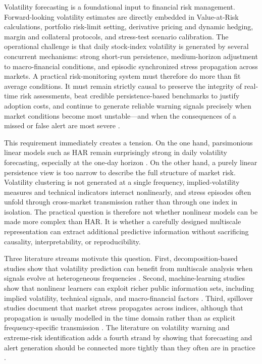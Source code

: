 Volatility forecasting is a foundational input to financial risk management. Forward-looking volatility estimates are directly embedded in Value-at-Risk calculations, portfolio risk-limit setting, derivative pricing and dynamic hedging, margin and collateral protocols, and stress-test scenario calibration. The operational challenge is that daily stock-index volatility is generated by several concurrent mechanisms: strong short-run persistence, medium-horizon adjustment to macro-financial conditions, and episodic synchronized stress propagation across markets. A practical risk-monitoring system must therefore do more than fit average conditions. It must remain strictly causal to preserve the integrity of real-time risk assessments, beat credible persistence-based benchmarks to justify adoption costs, and continue to generate reliable warning signals precisely when market conditions become most unstable---and when the consequences of a missed or false alert are most severe \cite{corsi2008har,song2022garchmidas,zeng2024macrodriven}.

This requirement immediately creates a tension. On the one hand, parsimonious linear models such as HAR remain surprisingly strong in daily volatility forecasting, especially at the one-day horizon \cite{corsi2008har,branco2024linear}. On the other hand, a purely linear persistence view is too narrow to describe the full structure of market risk. Volatility clustering is not generated at a single frequency, implied-volatility measures and technical indicators interact nonlinearly, and stress episodes often unfold through cross-market transmission rather than through one index in isolation. The practical question is therefore not whether nonlinear models can be made more complex than HAR. It is whether a carefully designed multiscale representation can extract additional predictive information without sacrificing causality, interpretability, or reproducibility.

Three literature streams motivate this question. First, decomposition-based studies show that volatility prediction can benefit from multiscale analysis when signals evolve at heterogeneous frequencies \cite{souropanis2023wavelet,zhuo2024harsvr,ma2025autoformerapplsci,su2025hybridapplsci}. Second, machine-learning studies show that nonlinear learners can exploit richer public information sets, including implied volatility, technical signals, and macro-financial factors \cite{diaz2024mlvalue,zhang2023intradayml,chun2025timing}. Third, spillover studies document that market stress propagates across indices, although that propagation is usually modelled in the time domain rather than as explicit frequency-specific transmission \cite{son2023gnnspillover}. The literature on volatility warning and extreme-risk identification adds a fourth strand by showing that forecasting and alert generation should be connected more tightly than they often are in practice \cite{ren2024extreme,ran2024earlywarning,purnell2024explainable}.

